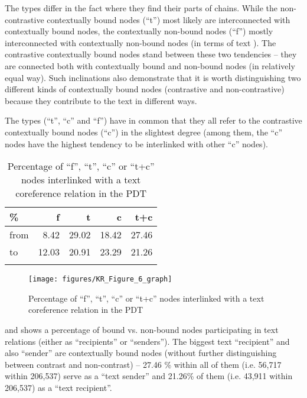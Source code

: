 \documentclass[output=paper]{langsci/langscibook.cls}
\begin{document}
The  types differ in the fact where they find their parts of  chains. While the non-contrastive contextually bound nodes (``t'') most likely are interconnected with contextually bound nodes, the contextually non-bound nodes (``f'') mostly interconnected with contextually non-bound nodes (in terms of text ). The contrastive contextually bound nodes stand between these two tendencies -- they are connected both with contextually bound and non-bound nodes (in relatively equal way). Such inclinations also demonstrate that it is worth distinguishing two different kinds of contextually bound nodes (contrastive and non-contrastive) because they contribute to the text  in different ways.




The  types (``t'', ``c'' and ``f'') have in common that they all refer to the contrastive contextually bound nodes (``c'') in the slightest degree (among them, the ``c'' nodes have the highest tendency to be interlinked with other ``c'' nodes).



\begin{table}
\caption{Percentage of ``f'', ``t'', ``c'' or ``t+c'' nodes interlinked with a text coreference relation in the PDT}
\begin{tabular}{lrrrr}
\lsptoprule
\% &
f &
t &
c &
t+c\\
\midrule
from &
8.42 &
29.02 &
18.42 &
27.46\\
to &
12.03 &
20.91 &
23.29 &
21.26\\
\lspbottomrule
\end{tabular}
\label{rysova_k:tab:4}
\end{table}


\begin{figure} 
\texttt{[image: figures/KR\_Figure\_6\_graph]}
\caption{Percentage of ``f'', ``t'', ``c'' or ``t+c'' nodes interlinked with a text coreference relation in the PDT}
\label{rysova_k:fig:6}
\end{figure}


 and  shows a percentage of bound vs. non-bound nodes participating in text  relations (either as ``recipients'' or ``senders''). The biggest text  ``recipient'' and also ``sender'' are contextually bound nodes (without further distinguishing between contrast and non-contrast) -- 27.46 \% within all of them (i.e. 56,717 within 206,537) serve as a ``text  sender'' and 21.26\% of them (i.e. 43,911 within 206,537) as a ``text  recipient''.
\end{document}
